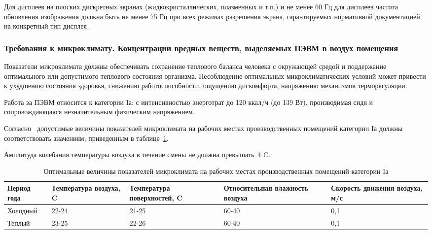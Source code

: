 Для дисплеев на плоских дискретных экранах (жидкокристаллических, плазменных и т.п.) и не менее 60 Гц 
для дисплеев частота обновления изображения должна быть не менее 75 Гц при всех режимах 
разрешения экрана, гарантируемых нормативной документацией на конкретный тип дисплея .~\cite{sanpin_2.4.1340-03}


\subsubsection{Требования к микроклимату. Концентрации вредных веществ, выделяемых ПЭВМ в воздух помещения}


 Показатели микроклимата должны обеспечивать сохранение теплового баланса человека с окружающей средой и 
 поддержание оптимального или допустимого теплового состояния организма.
 Несоблюдение оптимальных микроклиматических условий может привести к ухудшению состояния здоровья,
 снижению работоспособности, ощущению дискомфорта, напряжению механизмов терморегуляции.
 
 Работа за ПЭВМ относится к категории Iа: с интенсивностью энерготрат до 120 ккал/ч (до 139 Вт), 
 производимая сидя и сопровождающаяся незначительным физическим напряжением.~\cite{sanpin_mikroclimate} 
 
 Согласно~\cite{sanpin_mikroclimate} допустимые величины показателей микроклимата на рабочих местах производственных помещений категории Iа 
 должны соответствовать значениям, приведенным в таблице~\ref{tab:climate_1}. 
 
 Амплитуда колебания температуры воздуха в течение смены не должна превышать~4\textdegree{} C.
 
\begin{table}[h!]
\caption{ Оптимальные величины показателей микроклимата на рабочих местах производственных помещений категории Iа }
\label{tab:climate_1}
\begin{center}
\begin{tabularx}{\linewidth}{|X|X|X|X|X|}
\hline
Период года & Температура воздуха, \textdegree{}C & Температура поверхностей, \textdegree{}C & Относительная влажность воздуха & Скорость движения воздуха, м/с\\
\hline
Холодный & 22-24 & 21-25 & 60-40 & 0,1\\
\hline
Теплый & 23-25 & 22-26 & 60-40 & 0,1\\
\hline
\end{tabularx}
\end{center}
\end{table}


